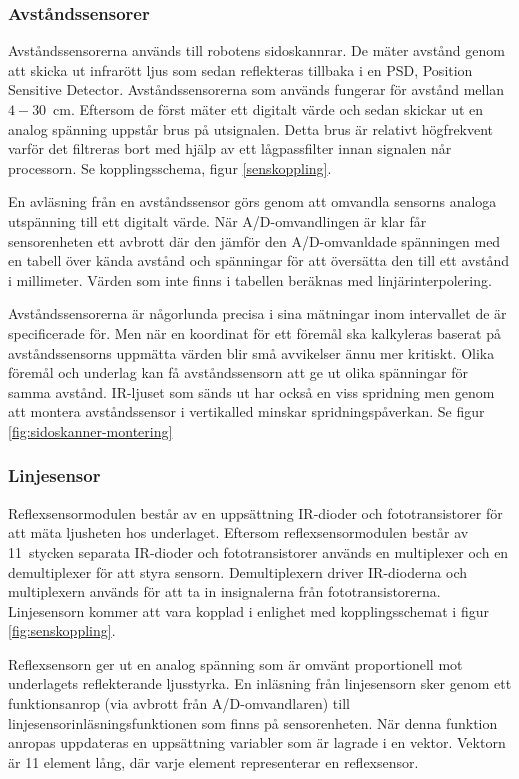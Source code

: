 \subsubsection{Avståndssensorer}
Avståndssensorerna används till robotens sidoskannrar. De mäter avstånd genom att skicka ut infrarött ljus som sedan reflekteras tillbaka i en PSD, Position Sensitive Detector. Avståndssensorerna som används fungerar för avstånd mellan \mbox{$4-30$ cm}. Eftersom de först mäter ett digitalt värde och sedan skickar ut en analog spänning uppstår brus på utsignalen. Detta brus är relativt högfrekvent varför det filtreras bort med hjälp av ett lågpassfilter innan signalen når processorn. Se kopplingsschema, figur \ref{senskoppling}.


En avläsning från en avståndssensor görs genom att omvandla sensorns analoga utspänning till ett digitalt värde. När A/D-omvandlingen är klar får sensorenheten ett avbrott där den jämför den A/D-omvanldade spänningen med en tabell över kända avstånd och spänningar för att översätta den till ett avstånd i millimeter. Värden som inte finns i tabellen beräknas med linjärinterpolering. 

Avståndssensorerna är någorlunda precisa i sina mätningar inom intervallet de är specificerade för. Men när en koordinat för ett föremål ska kalkyleras baserat på avståndssensorns uppmätta värden blir små avvikelser ännu mer kritiskt. Olika föremål och underlag kan få avståndssensorn att ge ut olika spänningar för samma avstånd. IR-ljuset som sänds ut har också en viss spridning men genom att montera avståndssensor i vertikalled minskar spridningspåverkan. Se figur \ref{fig:sidoskanner-montering}

\subsubsection{Linjesensor}
Reflexsensormodulen består av en uppsättning IR-dioder och fototransistorer för att mäta ljusheten hos underlaget. Eftersom reflexsensormodulen består av 11~stycken separata IR-dioder och fototransistorer används en multiplexer och en demultiplexer för att styra sensorn. Demultiplexern driver IR-dioderna och multiplexern används för att ta in insignalerna från fototransistorerna. Linjesensorn kommer att vara kopplad i enlighet med kopplingsschemat i figur \ref{fig:senskoppling}.

Reflexsensorn ger ut en analog spänning som är omvänt proportionell mot underlagets reflekterande ljusstyrka. En inläsning från linjesensorn sker genom ett funktionsanrop (via avbrott från A/D-omvandlaren) till linjesensorinläsningsfunktionen som finns på sensorenheten. När denna funktion anropas uppdateras en uppsättning variabler som är lagrade i en vektor. Vektorn är 11 element lång, där varje element representerar en reflexsensor.

